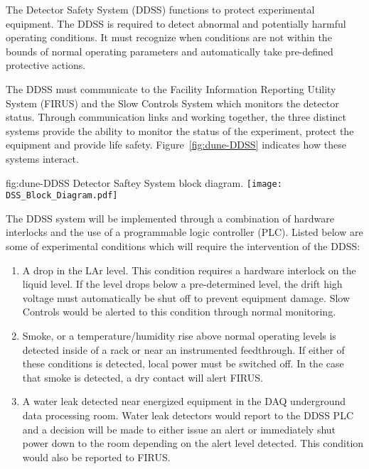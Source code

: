 The  Detector Safety System (DDSS) functions to protect
experimental equipment.  The DDSS is required to detect abnormal and
potentially harmful operating conditions.  It must recognize when
conditions are not within the bounds of normal operating parameters
and automatically take pre-defined protective actions.

The DDSS must communicate to the \surf Facility Information
Reporting Utility System (FIRUS) and the  Slow Controls
System which monitors the detector status.  Through communication
links and working together, the three distinct systems provide the
ability to monitor the status of the experiment, protect the equipment
and provide life safety. Figure~\ref{fig:dune-DDSS} indicates how
these systems interact.
\begin{dunefigure}{fig:dune-DDSS}
  {Detector Saftey System block diagram.}
  \texttt{[image: DSS\_Block\_Diagram.pdf]}
\end{dunefigure}

The DDSS system will be implemented through a combination of
hardware interlocks and the use of a programmable logic controller
(PLC).  Listed below are some of  experimental conditions which
will require the intervention of the DDSS:
\begin{enumerate}
 \item A drop in the LAr level.  This condition requires a hardware
   interlock on the liquid level.  If the level drops below a
   pre-determined level, the drift high voltage must automatically be
   shut off to prevent equipment damage.  Slow Controls would be
   alerted to this condition through normal monitoring.
 \item Smoke, or a temperature/humidity rise above normal operating
   levels is detected inside of a rack or near an instrumented
   feedthrough.  If either of these conditions is detected, local
   power must be switched off. In the case that smoke is detected, a
   dry contact will alert FIRUS.
 \item A water leak detected near energized equipment in the DAQ
   underground data processing room.  Water leak detectors would
   report to the DDSS PLC and a decision will be made to either
   issue an alert or immediately shut power down to the room depending
   on the alert level detected.  This condition would also be reported
   to FIRUS.
\end{enumerate}
